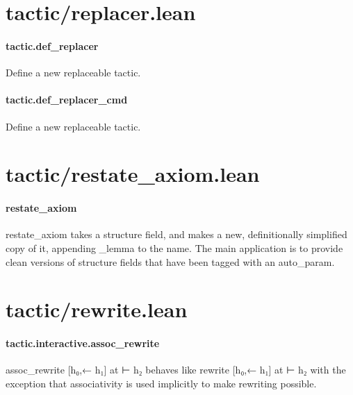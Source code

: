 \documentclass{article}
\begin{document}
\section{tactic/replacer.lean}\paragraph{tactic.def\_replacer}
\par
Define a new replaceable tactic.
\paragraph{tactic.def\_replacer\_cmd}
\par
Define a new replaceable tactic.
\section{tactic/restate\_axiom.lean}\paragraph{restate\_axiom}
\par
\colorbox[RGB]{253,246,227}{{{{\color[RGB]{101, 123, 131} restate\_axiom }}}} takes a structure field, and makes a new, definitionally simplified copy of it, appending 
\colorbox[RGB]{253,246,227}{{{{\color[RGB]{101, 123, 131} \_lemma }}}} to the name.
The main application is to provide clean versions of structure fields that have been tagged with an auto\_param.
\section{tactic/rewrite.lean}\paragraph{tactic.interactive.assoc\_rewrite}
\par
\colorbox[RGB]{253,246,227}{{{{\color[RGB]{101, 123, 131} assoc\_rewrite {[}h₀,← h₁{]}  }}}{{{\color[RGB]{133, 153, 0} at }}}{{{\color[RGB]{101, 123, 131}  ⊢ h₂ }}}} behaves like 
\colorbox[RGB]{253,246,227}{{{{\color[RGB]{101, 123, 131} rewrite {[}h₀,← h₁{]}  }}}{{{\color[RGB]{133, 153, 0} at }}}{{{\color[RGB]{101, 123, 131}  ⊢ h₂ }}}}with the exception that associativity is used implicitly to make rewriting
possible.
\end{document}
